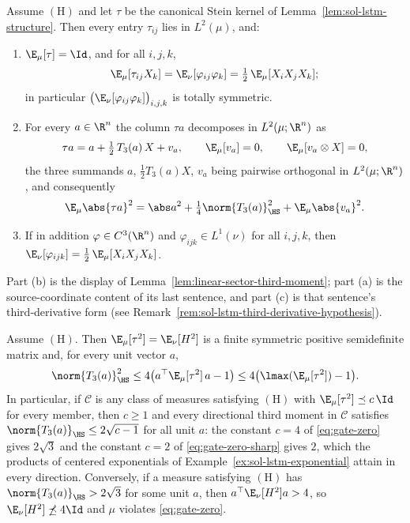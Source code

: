 \documentclass[../main.tex]{subfiles}
\begin{document}
\begin{theorem}
\label{thm:sol-lstm-main}
Assume $(\mathrm H)$ and let $\tau$ be the canonical Stein kernel of
Lemma~\ref{lem:sol-lstm-structure}.  Then every entry $\tau_{ij}$ lies in $L^2(\mu)$, and:
\begin{enumerate}
\item[(a)] $\E_\mu[\tau]=\Id$, and for all $i,j,k$,
  \[
    \E_\mu[\tau_{ij}X_k]=\E_\nu[\varphi_{ij}\varphi_k]=\tfrac12\,\E_\mu[X_iX_jX_k];
  \]
  in particular $\bigl(\E_\nu[\varphi_{ij}\varphi_k]\bigr)_{i,j,k}$ is totally symmetric.
\item[(b)] For every $a\in\R^n$ the column $\tau a$ decomposes in $L^2(\mu;\R^n)$ as
  \[
    \tau a=a+\tfrac12\,T_3(a)\,X+v_a,\qquad \E_\mu[v_a]=0,\qquad \E_\mu[v_a\otimes X]=0,
  \]
  the three summands $a$, $\tfrac12T_3(a)X$, $v_a$ being pairwise orthogonal in
  $L^2(\mu;\R^n)$, and consequently
  \begin{equation}
    \E_\mu\abs{\tau a}^2=\abs a^2+\tfrac14\norm{T_3(a)}_{\HS}^2+\E_\mu\abs{v_a}^2 .
    \label{eq:sol-lstm-pythagoras}
  \end{equation}
\item[(c)] If in addition $\varphi\in C^3(\R^n)$ and $\varphi_{ijk}\in L^1(\nu)$ for all
  $i,j,k$, then $\E_\nu[\varphi_{ijk}]=\tfrac12\,\E_\mu[X_iX_jX_k]$.
\end{enumerate}
\end{theorem}

Part (b) is the display of Lemma~\ref{lem:linear-sector-third-moment}; part (a) is the
source-coordinate content of its last sentence, and part (c) is that sentence's
third-derivative form (see Remark~\ref{rem:sol-lstm-third-derivative-hypothesis}).

\begin{corollary}
\label{cor:sol-lstm-gate}
Assume $(\mathrm H)$.  Then $\E_\mu[\tau^2]=\E_\nu[H^2]$ is a finite symmetric positive
semidefinite matrix and, for every unit vector $a$,
\[
  \norm{T_3(a)}_{\HS}^2\le4\bigl(a^\top\E_\mu[\tau^2]\,a-1\bigr)
  \le4\bigl(\lmax(\E_\mu[\tau^2])-1\bigr).
\]
In particular, if $\mathcal C$ is any class of measures satisfying $(\mathrm H)$ with
$\E_\mu[\tau^2]\preceq c\,\Id$ for every member, then $c\ge1$ and every directional third
moment in $\mathcal C$ satisfies $\norm{T_3(a)}_{\HS}\le2\sqrt{c-1}$ for all unit $a$: the
constant $c=4$ of \eqref{eq:gate-zero} gives $2\sqrt3$ and the constant $c=2$ of
\eqref{eq:gate-zero-sharp} gives $2$, which the products of centered exponentials of
Example~\ref{ex:sol-lstm-exponential} attain in every direction.  Conversely, if a measure
satisfying $(\mathrm H)$ has $\norm{T_3(a)}_{\HS}>2\sqrt3$ for some unit $a$, then
$a^\top\E_\nu[H^2]a>4$, so $\E_\nu[H^2]\not\preceq4\Id$ and $\mu$ violates \eqref{eq:gate-zero}.
\end{corollary}
\end{document}
